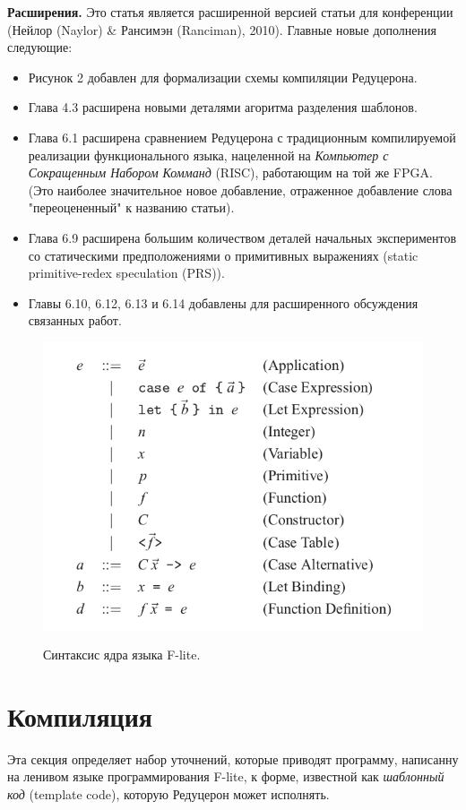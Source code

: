 \documentclass[flenqn, 14pt]{extarticle}
\begin{document}
\textbf{Расширения.} Это статья является расширенной версией статьи для конференции (Нейлор (Naylor) \& Рансимэн (Ranciman), 2010). Главные новые дополнения следующие:
\begin{itemize}
\item Рисунок 2 добавлен для формализации схемы компиляции Редуцерона.
\item Глава 4.3 расширена новыми деталями агоритма разделения шаблонов.
\item Глава 6.1 расширена сравнением Редуцерона с традиционным компилируемой реализации функционального языка, нацеленной на \textit{Компьютер с Сокращенным Набором Комманд} (RISC), работающим на той же FPGA. (Это наиболее значительное новое добавление, отраженное добавление слова "переоцененный" к названию статьи).
\item Глава 6.9 расширена большим количеством деталей начальных экспериментов со статическими предположениями о примитивных выражениях (static primitive-redex speculation (PRS)).
\item Главы 6.10, 6.12, 6.13 и 6.14 добавлены для расширенного обсуждения связанных работ.
\end{itemize}

\begin{figure}[t]
\centering
\includegraphics[scale=0.4]{core_syntax}
\label{fig:core_syntax}
\caption{Синтаксис ядра языка F-lite.}
\end{figure}

\section{Компиляция}
Эта секция определяет набор уточнений, которые приводят программу, написанну на ленивом языке программирования F-lite, к форме, известной как \textit{шаблонный код} (template code), которую Редуцерон может исполнять.
\end{document}
